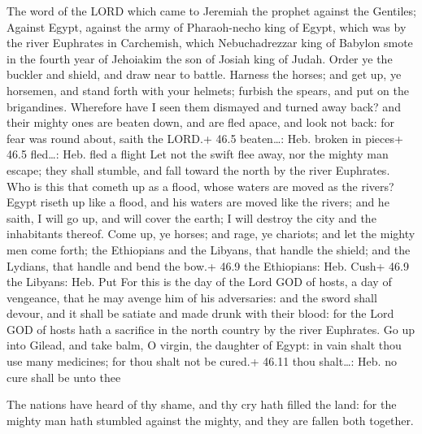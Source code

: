  The word of the LORD which came to Jeremiah the prophet
against the Gentiles;  Against Egypt, against the army of
Pharaoh-necho king of Egypt, which was by the river Euphrates in
Carchemish, which Nebuchadrezzar king of Babylon smote in the fourth
year of Jehoiakim the son of Josiah king of Judah.  Order ye
the buckler and shield, and draw near to battle.  Harness
the horses; and get up, ye horsemen, and stand forth with your helmets;
furbish the spears, and put on the brigandines.  Wherefore
have I seen them dismayed and turned away back? and their mighty ones
are beaten down, and are fled apace, and look not back: for fear was
round about, saith the LORD.+ 46.5 beaten\ldots: Heb. broken in pieces+
46.5 fled\ldots: Heb. fled a flight  Let not the swift flee
away, nor the mighty man escape; they shall stumble, and fall toward the
north by the river Euphrates.  Who is this that cometh up as
a flood, whose waters are moved as the rivers?  Egypt riseth
up like a flood, and his waters are moved like the rivers; and he saith,
I will go up, and will cover the earth; I will destroy the city and the
inhabitants thereof.  Come up, ye horses; and rage, ye
chariots; and let the mighty men come forth; the Ethiopians and the
Libyans, that handle the shield; and the Lydians, that handle and bend
the bow.+ 46.9 the Ethiopians: Heb. Cush+ 46.9 the Libyans: Heb. Put
 For this is the day of the Lord GOD of hosts, a day of
vengeance, that he may avenge him of his adversaries: and the sword
shall devour, and it shall be satiate and made drunk with their blood:
for the Lord GOD of hosts hath a sacrifice in the north country by the
river Euphrates.  Go up into Gilead, and take balm, O
virgin, the daughter of Egypt: in vain shalt thou use many medicines;
for thou shalt not be cured.+ 46.11 thou shalt\ldots: Heb. no cure shall
be unto thee

 The nations have heard of thy shame, and thy cry hath
filled the land: for the mighty man hath stumbled against the mighty,
and they are fallen both together.

